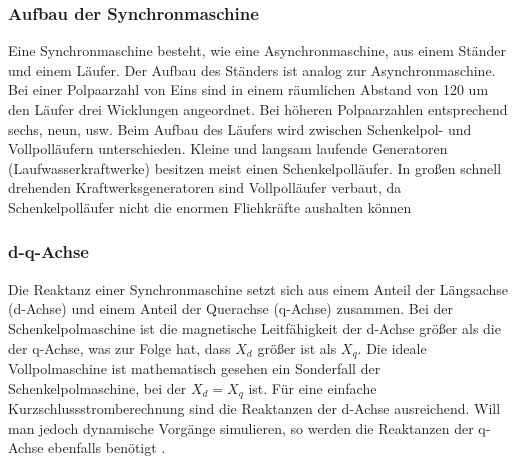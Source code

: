 \documentclass{scrartcl}
\begin{document}
\begin{onehalfspace}
\subsubsection{Aufbau der Synchronmaschine}
Eine Synchronmaschine besteht, wie eine Asynchronmaschine, aus einem Ständer und einem Läufer. Der Aufbau des Ständers ist analog zur Asynchronmaschine. Bei einer Polpaarzahl von Eins sind in einem räumlichen Abstand von 120\degree{} um den Läufer drei Wicklungen angeordnet. Bei höheren Polpaarzahlen entsprechend sechs, neun, usw. Beim Aufbau des Läufers wird zwischen Schenkelpol- und Vollpolläufern unterschieden. Kleine und langsam laufende Generatoren (Laufwasserkraftwerke) besitzen meist einen Schenkelpolläufer. In großen schnell drehenden Kraftwerksgeneratoren sind Vollpolläufer verbaut, da Schenkelpolläufer nicht die enormen Fliehkräfte aushalten können \cite[S. 508 ff]{Binder2012}

\subsubsection{d-q-Achse}
Die Reaktanz einer Synchronmaschine setzt sich aus einem Anteil der Längsachse (d-Achse) und einem Anteil der Querachse (q-Achse) zusammen. Bei der Schenkelpolmaschine ist die magnetische Leitfähigkeit der d-Achse größer als die der q-Achse, was zur Folge hat, dass $X_d$ größer ist als $X_q$. Die ideale Vollpolmaschine ist mathematisch gesehen ein Sonderfall der Schenkelpolmaschine, bei der $X_d = X_q$ ist. Für eine einfache Kurzschlussstromberechnung sind die Reaktanzen der d-Achse ausreichend. Will man jedoch dynamische Vorgänge simulieren, so werden die Reaktanzen der q-Achse ebenfalls benötigt \cite[S. 184]{Heuck2007}. \\


\end{onehalfspace}
\end{document}
